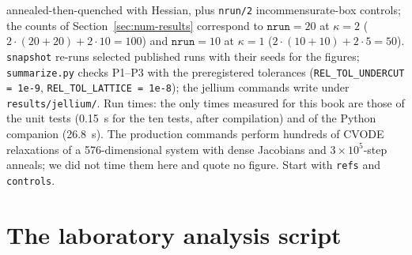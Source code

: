 annealed-then-quenched with Hessian, plus \texttt{nrun/2} incommensurate-box controls; the counts of
Section~\ref{sec:num-results} correspond to $\texttt{nrun}=20$ at $\kappa=2$ ($2\cdot(20+20)+2\cdot10=100$) and
$\texttt{nrun}=10$ at $\kappa=1$ ($2\cdot(10+10)+2\cdot5=50$). \texttt{snapshot} re-runs selected published runs with
their seeds for the figures; \texttt{summarize.py} checks P1--P3 with the preregistered tolerances
(\texttt{REL\_\allowbreak TOL\_\allowbreak UNDERCUT = 1e-9}, \texttt{REL\_\allowbreak TOL\_\allowbreak LATTICE = 1e-8});
the jellium commands write under \texttt{results/jellium/}. Run times: the only times measured for this book are those of the unit tests (0.15~s for the ten tests, after
compilation) and of the Python companion (26.8~s). The production commands perform hundreds of CVODE relaxations of a
576-dimensional system with dense Jacobians and $3\times10^5$-step anneals; we did not time them here and quote no
figure. Start with \texttt{refs} and \texttt{controls}.

\section{The laboratory analysis script}\label{sec:num-lab}


